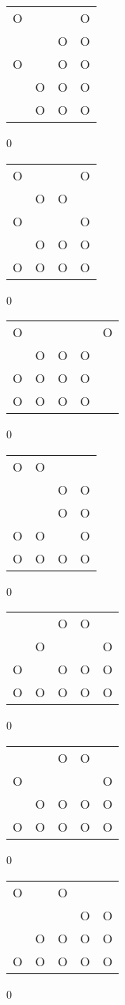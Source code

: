 \begin{tabular}{|m{0.2cm}m{0.2cm}m{0.2cm}m{0.2cm}|}\hline
O& & &O\\
 & &O&O\\
O& &O&O\\
 &O&O&O\\
 &O&O&O\\
\hline\end{tabular}0
\begin{tabular}{|m{0.2cm}m{0.2cm}m{0.2cm}m{0.2cm}|}\hline
O& & &O\\
 &O&O& \\
O& & &O\\
 &O&O&O\\
O&O&O&O\\
\hline\end{tabular}0
\begin{tabular}{|m{0.2cm}m{0.2cm}m{0.2cm}m{0.2cm}m{0.2cm}|}\hline
O& & & &O\\
 &O&O&O& \\
O&O&O&O& \\
O&O&O&O& \\
\hline\end{tabular}0
\begin{tabular}{|m{0.2cm}m{0.2cm}m{0.2cm}m{0.2cm}|}\hline
O&O& & \\
 & &O&O\\
 & &O&O\\
O&O& &O\\
O&O&O&O\\
\hline\end{tabular}0
\begin{tabular}{|m{0.2cm}m{0.2cm}m{0.2cm}m{0.2cm}m{0.2cm}|}\hline
 & &O&O& \\
 &O& & &O\\
O& &O&O&O\\
O&O&O&O&O\\
\hline\end{tabular}0
\begin{tabular}{|m{0.2cm}m{0.2cm}m{0.2cm}m{0.2cm}m{0.2cm}|}\hline
 & &O&O& \\
O& & & &O\\
 &O&O&O&O\\
O&O&O&O&O\\
\hline\end{tabular}0
\begin{tabular}{|m{0.2cm}m{0.2cm}m{0.2cm}m{0.2cm}m{0.2cm}|}\hline
O& &O& & \\
 & & &O&O\\
 &O&O&O&O\\
O&O&O&O&O\\
\hline\end{tabular}0
